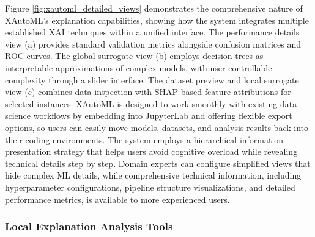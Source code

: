Figure \ref{fig:xautoml_detailed_views} demonstrates the comprehensive nature of XAutoML's explanation capabilities, showing how the system integrates multiple established XAI techniques within a unified interface. The performance details view (a) provides standard validation metrics alongside confusion matrices and ROC curves. The global surrogate view (b) employs decision trees as interpretable approximations of complex models, with user-controllable complexity through a slider interface. The dataset preview and local surrogate view (c) combines data inspection with SHAP-based feature attributions for selected instances.
XAutoML is designed to work smoothly with existing data science workflows by embedding into JupyterLab and offering flexible export options, so users can easily move models, datasets, and analysis results back into their coding environments. The system employs a hierarchical information presentation strategy that helps users avoid cognitive overload while revealing technical details step by step. Domain experts can configure simplified views that hide complex ML details, while comprehensive technical information, including hyperparameter configurations, pipeline structure visualizations, and detailed performance metrics, is available to more experienced users.





\subsubsection{Local Explanation Analysis Tools}

